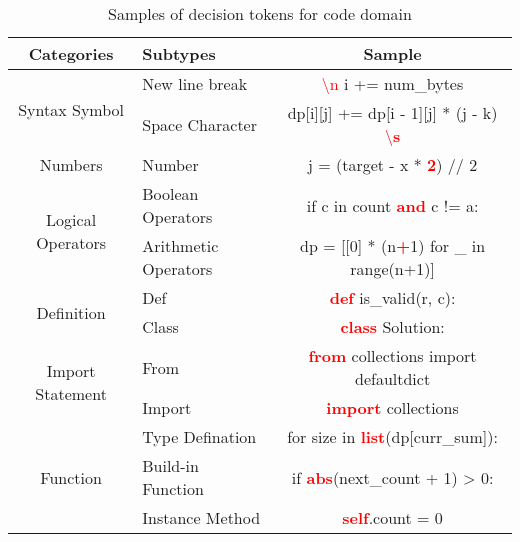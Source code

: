 \begin{table*}[htbp]
  \caption{Samples of decision tokens for code domain}
    \noindent 

    \begin{minipage}{\textwidth}
    
   \setlength{\abovecaptionskip}{7pt}
   \setlength{\cmidrulewidth}{0.01em}
   \renewcommand{\tabcolsep}{10pt}
   \renewcommand{\arraystretch}{1.2}
   \centering
   \begin{tabular}{cl|c}
   
   \toprule
        Categories & \hspace{2.3em}Subtypes & Sample\\
        
         \midrule
         \multirow{2}{*}{Syntax Symbol} &
          \vline \hspace{0.9em} New line break  & \textcolor{red}{\textbackslash n} i += num\_bytes \\
         & \vline \hspace{0.8em} Space Character & dp[i][j] += dp[i - 1][j] * (j - k) \textcolor{red}{\textbackslash \textbf{s}} \\
             

        \multirow{1}{*}{Numbers}& \hspace{2.0em} Number & j = (target - x * \textcolor{red}{\textbf{2}}) // 2\\
        
         \multirow{2}{*}{Logical Operators} &
        \vline \hspace{0.3em} Boolean Operators & if c in count \textcolor{red}{\textbf{and}} c != a:\\
        & \vline \hspace{0em}Arithmetic Operators & dp = [[0] * (n\textcolor{red}{\textbf{+}}1) for \_ in range(n+1)]\\
         \multirow{2}{*}{Definition} & \hspace{2.8em} Def & \textcolor{red}{\textbf{def}} is\_valid(r, c):\\
         & \hspace{2.8em}Class & \textcolor{red}{\textbf{class}} Solution:\\
         \multirow{2}{*}{Import Statement}& \hspace{2.7em} From &\textcolor{red}{\textbf{from}} collections import defaultdict \\
         & \hspace{2.3em} Import & \textcolor{red}{\textbf{import}} collections\\
         \multirow{3}{*}{Function}& \vline \hspace{1.0em} Type Defination & for size in \textcolor{red}{\textbf{list}}(dp[curr\_sum]):\\
         & \vline \hspace{0.8em} Build-in Function & if \textcolor{red}{\textbf{abs}}(next\_count + 1) > 0:\\
         & \vline \hspace{0.8em} Instance Method & \textcolor{red}{\textbf{self}}.count = 0\\
         

\end{tabular}
\end{minipage}
\end{table*}
